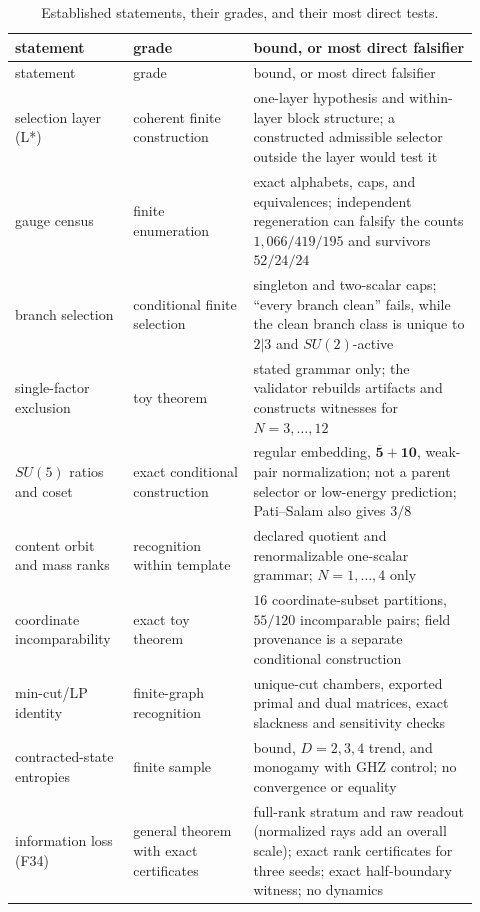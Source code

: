 \begin{longtable}[]{@{}p{0.23\linewidth}p{0.24\linewidth}p{0.45\linewidth}@{}}
\caption{Established statements, their grades, and their most direct tests.}\label{tab:certified-scope}\\
\toprule
statement & grade & bound, or most direct falsifier\\
\midrule
\endfirsthead
\toprule
statement & grade & bound, or most direct falsifier\\
\midrule
\endhead
selection layer (L*) & coherent finite construction & one-layer hypothesis and within-layer block structure; a
constructed admissible selector outside the layer would test it\\
gauge census & finite enumeration & exact alphabets, caps, and equivalences; independent regeneration can falsify the
counts \(1{,}066/419/195\) and survivors \(52/24/24\)\\
branch selection & conditional finite selection & singleton and two-scalar caps; ``every branch clean'' fails, while the
clean branch class is unique to \(2|3\) and \(SU(2)\)-active\\
single-factor exclusion & toy theorem & stated grammar only; the validator rebuilds artifacts and constructs witnesses for
\(N=3,\dots,12\)\\
\(SU(5)\) ratios and coset & exact conditional construction & regular embedding, \(\overline{\mathbf5}+\mathbf{10}\),
weak-pair normalization; not a parent selector or low-energy prediction; Pati--Salam also gives \(3/8\)\\
content orbit and mass ranks & recognition within template & declared quotient and renormalizable one-scalar grammar;
\(N=1,\dots,4\) only\\
coordinate incomparability & exact toy theorem & \(16\) coordinate-subset partitions, \(55/120\) incomparable pairs;
field provenance is a separate conditional construction\\
min-cut/LP identity & finite-graph recognition & unique-cut chambers, exported primal and dual matrices, exact slackness
and sensitivity checks\\
contracted-state entropies & finite sample & bound, \(D=2,3,4\) trend, and monogamy with GHZ control; no convergence or
equality\\
information loss (F34) & general theorem with exact certificates & full-rank stratum and raw readout (normalized rays add
an overall scale); exact rank certificates for three seeds; exact half-boundary witness; no dynamics\\

\end{longtable}
